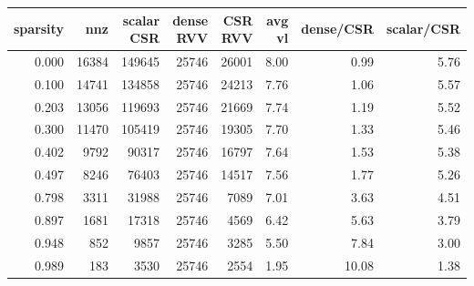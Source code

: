\begin{tabular}{rrrrrrrr}
\toprule
sparsity & nnz & scalar CSR & dense RVV & CSR RVV & avg vl & dense/CSR & scalar/CSR \\
\midrule
0.000 & 16384 & 149645 & 25746 & 26001 & 8.00 & 0.99 & 5.76 \\
0.100 & 14741 & 134858 & 25746 & 24213 & 7.76 & 1.06 & 5.57 \\
0.203 & 13056 & 119693 & 25746 & 21669 & 7.74 & 1.19 & 5.52 \\
0.300 & 11470 & 105419 & 25746 & 19305 & 7.70 & 1.33 & 5.46 \\
0.402 & 9792 & 90317 & 25746 & 16797 & 7.64 & 1.53 & 5.38 \\
0.497 & 8246 & 76403 & 25746 & 14517 & 7.56 & 1.77 & 5.26 \\
0.798 & 3311 & 31988 & 25746 & 7089 & 7.01 & 3.63 & 4.51 \\
0.897 & 1681 & 17318 & 25746 & 4569 & 6.42 & 5.63 & 3.79 \\
0.948 & 852 & 9857 & 25746 & 3285 & 5.50 & 7.84 & 3.00 \\
0.989 & 183 & 3530 & 25746 & 2554 & 1.95 & 10.08 & 1.38 \\
\bottomrule
\end{tabular}
